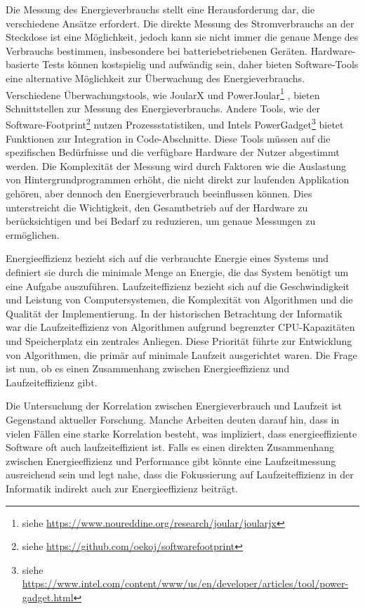 \documentclass{article}
\begin{document}
Die Messung des Energieverbrauchs  stellt eine Herausforderung dar, die verschiedene Ansätze erfordert. Die direkte Messung des Stromverbrauchs an der Steckdose ist eine Möglichkeit, jedoch kann sie nicht immer die genaue Menge des Verbrauchs bestimmen, insbesondere bei batteriebetriebenen Geräten. Hardware-basierte Tests können kostspielig und aufwändig sein, daher bieten Software-Tools eine alternative Möglichkeit zur Überwachung des Energieverbrauchs.
Verschiedene Überwachungstools, wie JoularX und PowerJoular\footnote{%
   siehe  \href{https://www.noureddine.org/research/joular/joularjx}{https://www.noureddine.org/research/joular/joularjx}} \cite{noureddine-ie-2022}, bieten Schnittstellen zur Messung des Energieverbrauchs. Andere Tools, wie der Software-Footprint\footnote{%
   siehe  \href{https://github.com/oekoj/softwarefootprint}{https://github.com/oekoj/softwarefootprint}} nutzen Prozessstatistiken, und Intels PowerGadget\footnote{%
   siehe \href{https://www.intel.com/content/www/us/en/developer/articles/tool/power-gadget.html}{https://www.intel.com/content/www/us/en/developer/articles/tool/power-gadget.html}}  bietet Funktionen zur Integration in Code-Abschnitte. Diese Tools müssen auf die spezifischen Bedürfnisse und die verfügbare Hardware der Nutzer abgestimmt werden.
Die Komplexität der Messung wird durch Faktoren wie die Auslastung von Hintergrundprogrammen erhöht, die nicht direkt zur laufenden Applikation gehören, aber dennoch den Energieverbrauch beeinflussen können. Dies unterstreicht die Wichtigkeit, den Gesamtbetrieb auf der Hardware zu berücksichtigen und bei Bedarf zu reduzieren, um genaue Messungen zu ermöglichen. 


Energieeffizienz bezieht sich auf die verbrauchte Energie eines Systems \cite{brown_toward_2010} und definiert
sie durch die minimale Menge an Energie, die das System benötigt um eine Aufgabe auszuführen.
Laufzeiteffizienz bezieht sich auf die Geschwindigkeit und Leistung von Computersystemen, die Komplexität von Algorithmen und die Qualität der Implementierung.
In der historischen Betrachtung der Informatik war die Laufzeiteffizienz von Algorithmen aufgrund begrenzter CPU-Kapazitäten und Speicherplatz ein zentrales Anliegen. Diese Priorität führte zur Entwicklung von Algorithmen, die primär auf minimale Laufzeit ausgerichtet waren. Die Frage ist nun, ob es einen Zusammenhang zwischen Energieeffizienz und Laufzeiteffizienz gibt. 



Die Untersuchung der Korrelation zwischen Energieverbrauch und Laufzeit ist Gegenstand aktueller Forschung.
Manche Arbeiten \cite{pereira_energy_2017,cascaval_folklore_2014,pinto_energy_2017} deuten darauf hin, dass in vielen Fällen eine starke Korrelation besteht, was impliziert, dass energieeffiziente Software oft auch laufzeiteffizient ist. Falls es einen direkten Zusammenhang zwischen Energieeffizienz und Performance gibt  könnte eine Laufzeitmessung ausreichend sein und legt nahe, dass die Fokussierung auf Laufzeiteffizienz in der Informatik indirekt auch zur Energieeffizienz beiträgt.
\end{document}
